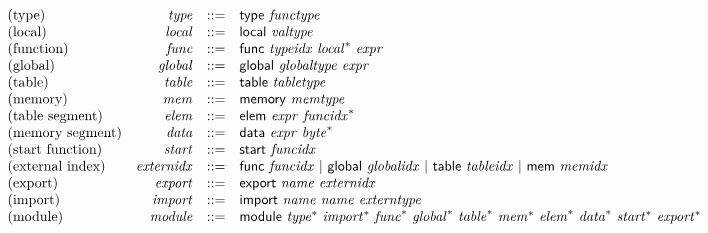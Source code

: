 \vspace{1ex}

$$
\begin{array}{@{}lrrl@{}l@{}}
\mbox{(type)} & {\mathit{type}} &::=& \mathsf{type}~{\mathit{functype}} \\
\mbox{(local)} & {\mathit{local}} &::=& \mathsf{local}~{\mathit{valtype}} \\
\mbox{(function)} & {\mathit{func}} &::=& \mathsf{func}~{\mathit{typeidx}}~{{\mathit{local}}^\ast}~{\mathit{expr}} \\
\mbox{(global)} & {\mathit{global}} &::=& \mathsf{global}~{\mathit{globaltype}}~{\mathit{expr}} \\
\mbox{(table)} & {\mathit{table}} &::=& \mathsf{table}~{\mathit{tabletype}} \\
\mbox{(memory)} & {\mathit{mem}} &::=& \mathsf{memory}~{\mathit{memtype}} \\
\mbox{(table segment)} & {\mathit{elem}} &::=& \mathsf{elem}~{\mathit{expr}}~{{\mathit{funcidx}}^\ast} \\
\mbox{(memory segment)} & {\mathit{data}} &::=& \mathsf{data}~{\mathit{expr}}~{{\mathit{byte}}^\ast} \\
\mbox{(start function)} & {\mathit{start}} &::=& \mathsf{start}~{\mathit{funcidx}} \\
\mbox{(external index)} & {\mathit{externidx}} &::=& \mathsf{func}~{\mathit{funcidx}} ~|~ \mathsf{global}~{\mathit{globalidx}} ~|~ \mathsf{table}~{\mathit{tableidx}} ~|~ \mathsf{mem}~{\mathit{memidx}} \\
\mbox{(export)} & {\mathit{export}} &::=& \mathsf{export}~{\mathit{name}}~{\mathit{externidx}} \\
\mbox{(import)} & {\mathit{import}} &::=& \mathsf{import}~{\mathit{name}}~{\mathit{name}}~{\mathit{externtype}} \\
\mbox{(module)} & {\mathit{module}} &::=& \mathsf{module}~{{\mathit{type}}^\ast}~{{\mathit{import}}^\ast}~{{\mathit{func}}^\ast}~{{\mathit{global}}^\ast}~{{\mathit{table}}^\ast}~{{\mathit{mem}}^\ast}~{{\mathit{elem}}^\ast}~{{\mathit{data}}^\ast}~{{\mathit{start}}^\ast}~{{\mathit{export}}^\ast} \\
\end{array}
$$

\vspace{1ex}

\vspace{1ex}

\vspace{1ex}

